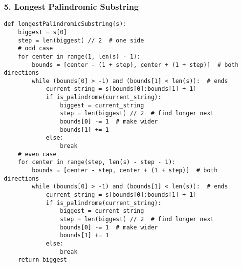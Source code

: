 \begin{frame}[fragile]\frametitle{5. Longest Palindromic Substring}

		\begin{lstlisting}[basicstyle=\scriptsize]
def longestPalindromicSubstring(s):
    biggest = s[0]
    step = len(biggest) // 2  # one side
    # odd case
    for center in range(1, len(s) - 1):
        bounds = [center - (1 + step), center + (1 + step)]  # both directions
        while (bounds[0] > -1) and (bounds[1] < len(s)):  # ends
            current_string = s[bounds[0]:bounds[1] + 1]
            if is_palindrome(current_string):
                biggest = current_string
                step = len(biggest) // 2  # find longer next
                bounds[0] -= 1  # make wider
                bounds[1] += 1
            else:
                break
    # even case
    for center in range(step, len(s) - step - 1):
        bounds = [center - step, center + (1 + step)]  # both directions
        while (bounds[0] > -1) and (bounds[1] < len(s)):  # ends
            current_string = s[bounds[0]:bounds[1] + 1]
            if is_palindrome(current_string):
                biggest = current_string
                step = len(biggest) // 2  # find longer next
                bounds[0] -= 1  # make wider
                bounds[1] += 1
            else:
                break
    return biggest
		\end{lstlisting}		

\end{frame}

